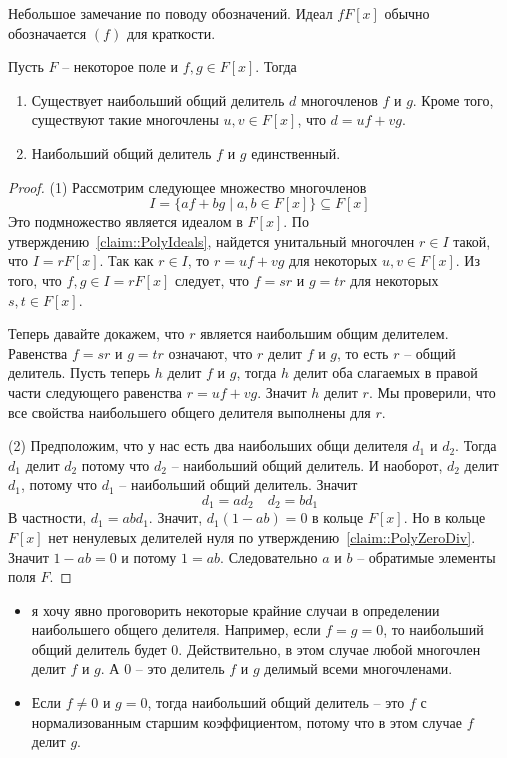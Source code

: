 Небольшое замечание по поводу обозначений.
Идеал $fF[x]$ обычно обозначается $(f)$ для краткости.

\begin{claim}
\label{claim::PolyGCD}
Пусть $F$ -- некоторое поле и $f,g\in F[x]$.
Тогда
\begin{enumerate}
\item Существует наибольший общий делитель $d$ многочленов $f$ и $g$.
Кроме того, существуют такие многочлены $u,v\in F[x]$, что $d = uf + v g$.

\item Наибольший общий делитель $f$ и $g$ единственный.
\end{enumerate}
\end{claim}
\begin{proof}
(1) Рассмотрим следующее множество многочленов
\[
I = \{a f + b g \mid a, b \in F[x]\}\subseteq F[x]
\]
Это подмножество является идеалом в $F[x]$.
По утверждению~\ref{claim::PolyIdeals}, найдется унитальный многочлен $r\in I$ такой, что $I = r F[x]$.
Так как $r\in I$, то $r = uf + vg$ для некоторых $u, v\in F[x]$.
Из того, что $f, g \in I = r F[x]$ следует, что $f = s r$ и $g = t r$ для некоторых $s, t \in F[x]$.

Теперь давайте докажем, что $r$ является наибольшим общим делителем.
Равенства $f = s r$ и $g = t r$ означают, что $r$ делит $f$ и $g$, то есть $r$ -- общий делитель.
Пусть теперь $h$ делит $f$ и $g$, тогда $h$ делит оба слагаемых в правой части следующего равенства $r = uf + vg$.
Значит $h$ делит $r$.
Мы проверили, что все свойства наибольшего общего делителя выполнены для $r$.

(2) Предположим, что у нас есть два наибольших общи делителя $d_1$ и $d_2$.
Тогда $d_1$ делит $d_2$ потому что $d_2$ -- наибольший общий делитель.
И наоборот, $d_2$ делит $d_1$, потому что $d_1$ -- наибольший общий делитель.
Значит
\[
d_1 = a d_2\quad d_2 = b d_1
\]
В частности, $d_1 = ab d_1$.
Значит, $d_1(1 - ab)= 0$ в кольце $F[x]$.
Но в кольце $F[x]$ нет ненулевых делителей нуля по утверждению~\ref{claim::PolyZeroDiv}.
Значит $1 - ab = 0$ и потому $1 = ab$.
Следовательно $a$ и $b$ -- обратимые элементы поля $F$.
\end{proof}

\begin{remarks}
\begin{itemize}
\item я хочу явно проговорить некоторые крайние случаи в определении наибольшего общего делителя.
Например, если $f = g = 0$, то наибольший общий делитель будет $0$.
Действительно, в этом случае любой многочлен делит $f$ и $g$.
А $0$ -- это делитель $f$ и $g$ делимый всеми многочленами.

\item Если $f \neq 0$ и $g = 0$, тогда наибольший общий делитель -- это $f$ с нормализованным старшим коэффициентом, потому что в этом случае $f$ делит $g$.
\end{itemize}
\end{remarks}



